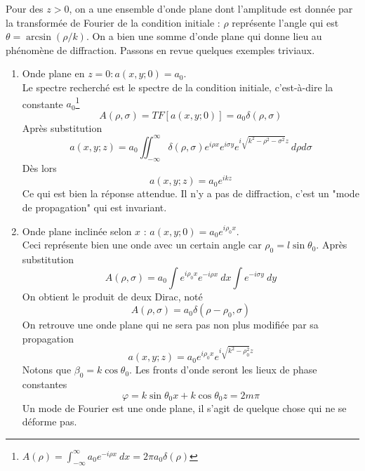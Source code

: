 Pour des $z>0$, on a une ensemble d'onde plane dont l'amplitude est donnée par la transformée de 
Fourier de la condition initiale : $\rho$ représente l'angle qui est $\theta = \arcsin(\rho/k)$. 
On a bien une somme d'onde plane qui donne lieu au phénomène de diffraction. Passons en revue 
quelques exemples triviaux.
\begin{enumerate}
\item Onde plane en $z=0 : a(x,y;0) = a_0$.\\
Le spectre recherché est le spectre de la condition initiale, c'est-à-dire la constante $a_0$\footnote{
$A(\rho) = \int_{-\infty}^\infty a_0e^{-i\rho x}\ dx = 2\pi a_0\delta(\rho)$}
\begin{equation}
A(\rho,\sigma) = TF[a(x,y;0)] = a_0\delta(\rho,\sigma)
\end{equation}
Après substitution
\begin{equation}
a(x,y;z) = a_0\iint_{-\infty}^\infty \delta(\rho,\sigma)e^{i\rho x}e^{i\sigma y} e^{i\sqrt{k^2-\rho^2-
\sigma^2}z}\ d\rho d\sigma
\end{equation}
Dès lors
\begin{equation}
a(x,y;z) = a_0e^{ikz}
\end{equation}
Ce qui est bien la réponse attendue. Il n'y a pas de diffraction, c'est un "mode de propagation" qui 
est invariant.
\item Onde plane inclinée selon $x$ : $a(x,y;0) = a_0e^{i\rho_0x}$.\\
Ceci représente bien une onde avec un certain angle car $\rho_0 = l\sin\theta_0$. Après 
substitution %
\begin{equation}
A(\rho,\sigma) = a_0\int e^{i\rho_0x}e^{-i\rho x}\ dx \int e^{-i\sigma y}\ dy
\end{equation}
On obtient le produit de deux Dirac, noté 
\begin{equation}
A(\rho,\sigma) = a_0\delta(\rho-\rho_0,\sigma)
\end{equation}
On retrouve une onde plane qui ne sera pas non plus modifiée par sa propagation
\begin{equation}
a(x,y;z) = a_0e^{i\rho_0x}e^{i\sqrt{k^2-\rho_0^2}z}
\end{equation}
Notons que $\beta_0 = k\cos\theta_0$. Les fronts d'onde seront les lieux de phase 
constantes
\begin{equation}
\varphi = k\sin\theta_0x + k\cos\theta_0 z = 2m\pi
\end{equation}
Un mode de Fourier est une onde plane, il s'agit de quelque chose qui ne se déforme pas.


\end{enumerate}
